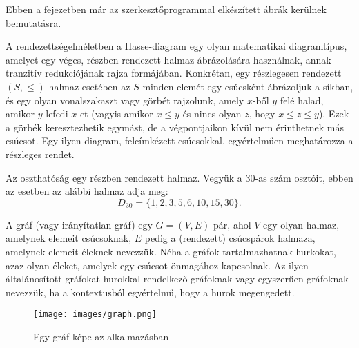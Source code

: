 
Ebben a fejezetben már az szerkesztőprogrammal elkészített ábrák kerülnek bemutatásra. 


A rendezettségelméletben a Hasse-diagram egy olyan matematikai diagramtípus, amelyet egy véges, részben rendezett halmaz ábrázolására használnak, annak tranzitív redukciójának rajza formájában. Konkrétan, egy részlegesen rendezett $(S, \leq)$ halmaz esetében az $S$ minden elemét egy csúcsként ábrázoljuk a síkban, és egy olyan vonalszakaszt vagy görbét rajzolunk, amely $x$-ből $y$ felé halad, amikor $y$ lefedi $x$-et (vagyis amikor $x \leq y$ és nincs olyan $z$, hogy $x \leq z \leq y$). Ezek a görbék keresztezhetik egymást, de a végpontjaikon kívül nem érinthetnek más csúcsot. Egy ilyen diagram, felcímkézett csúcsokkal, egyértelműen meghatározza a részleges rendet.

Az oszthatóság egy részben rendezett halmaz. Vegyük a 30-as szám osztóit, ebben az esetben az alábbi halmaz adja meg: 
$$D_{30} = \{1,2,3,5,6,10,15,30\}.$$



A gráf (vagy irányítatlan gráf) egy $G = (V, E)$ pár, ahol $V$ egy olyan halmaz, amelynek elemeit csúcsoknak, $E$ pedig a (rendezett) csúcspárok halmaza, amelynek elemeit éleknek nevezzük. Néha a gráfok tartalmazhatnak hurkokat, azaz olyan éleket, amelyek egy csúcsot önmagához kapcsolnak. Az ilyen általánosított gráfokat hurokkal rendelkező gráfoknak vagy egyszerűen gráfoknak nevezzük, ha a kontextusból egyértelmű, hogy a hurok megengedett.

\begin{figure}[!h]
	\label{fig:graph_editor}
	\centering
	\texttt{[image: images/graph.png]}
	\caption{Egy gráf képe az alkalmazásban}
\end{figure}

